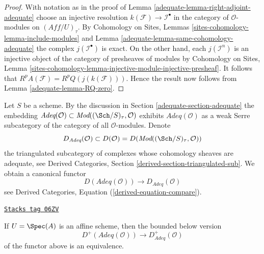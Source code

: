 \begin{proof}

With notation as in the proof of
Lemma \ref{adequate-lemma-right-adjoint-adequate}
choose an injective resolution $k(\mathcal{F}) \to \mathcal{I}^\bullet$
in the category of $\mathcal{O}$-modules on $(\textit{Aff}/U)_\tau$.
By
Cohomology on Sites, Lemmas \ref{sites-cohomology-lemma-include-modules}
and
Lemma \ref{adequate-lemma-same-cohomology-adequate}
the complex $j(\mathcal{I}^\bullet)$ is exact.
On the other hand, each $j(\mathcal{I}^n)$ is an injective object
of the category of presheaves of modules by
Cohomology on Sites, Lemma
\ref{sites-cohomology-lemma-injective-module-injective-presheaf}.
It follows that $R^pA(\mathcal{F}) = R^pQ(j(k(\mathcal{F})))$.
Hence the result now follows from
Lemma \ref{adequate-lemma-RQ-zero}.
\end{proof}

Let $S$ be a scheme. By the discussion in
Section \ref{adequate-section-adequate}
the embedding
$\textit{Adeq}(\mathcal{O}) \subset
\textit{Mod}((\Sch/S)_\tau, \mathcal{O})$
exhibits $\textit{Adeq}(\mathcal{O})$ as a weak Serre subcategory of
the category of all $\mathcal{O}$-modules. Denote
$$
D_{\textit{Adeq}}(\mathcal{O}) \subset
D(\mathcal{O}) = D(\textit{Mod}((\Sch/S)_\tau, \mathcal{O}))
$$
the triangulated subcategory of complexes whose cohomology sheaves
are adequate, see
Derived Categories, Section \ref{derived-section-triangulated-sub}.
We obtain a canonical functor
$$
D(\textit{Adeq}(\mathcal{O}))
\longrightarrow
D_{\textit{Adeq}}(\mathcal{O})
$$
see
Derived Categories, Equation (\ref{derived-equation-compare}).

\begin{lemma}
\label{adequate-lemma-bounded-below}
\href{https://stacks.math.columbia.edu/tag/06ZV}{\texttt{Stacks tag 06ZV}}

If $U = \Spec(A)$ is an affine scheme, then the bounded
below version
\begin{equation}
\label{equation-compare-bounded-adequate}
D^+(\textit{Adeq}(\mathcal{O}))
\longrightarrow
D^+_{\textit{Adeq}}(\mathcal{O})
\end{equation}
of the functor above is an equivalence.
\end{lemma}


